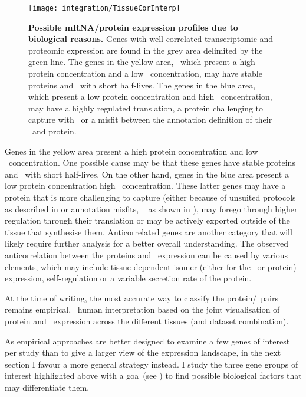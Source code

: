 \begin{figure}[!htb]
    \texttt{[image: integration/TissueCorInterp]}\centering
    \vspace{-3mm}
    \caption[Possible mRNA/protein expression profiles
    due to biological reasons.]{\label{fig:CorImprovable}%
    \textbf{Possible mRNA/protein expression profiles due to biological reasons.}
    Genes with well-correlated transcriptomic and proteomic expression
    are found in the grey area delimited by the green line.
    The genes in the yellow area,
    \ie\ which present a high protein concentration and a low \mRNA\ concentration,
    may have stable proteins and \mRNAs\ with short half-lives.
    The genes in the blue area,
    which present a low protein concentration and high \mRNA\ concentration,
    may have a highly regulated translation,
    a protein challenging to capture with \ms\,
    or a misfit between the annotation definition of their \mRNA\ and protein.
    }
\end{figure}

Genes in the yellow area present a high protein concentration
and low \mRNA\ concentration.
One possible cause may be that these genes have stable proteins
and \mRNAs\ with short half-lives.
On the other hand,
genes in the blue area present a low protein concentration
high \mRNA\ concentration.
These latter genes may have a protein that is more challenging to capture
(either because of unsuited protocols as described in 
or annotation misfits, \eg\  as shown in ),
may forego through higher regulation through their translation
or may be actively exported outside of the tissue that synthesise them.
Anticorrelated genes are another category that will likely require
further analysis for a better overall understanding.
The observed anticorrelation between the proteins and \mRNAs\ expression
can be caused by various elements, which may include
tissue dependent isomer (either for the \mRNA\ or protein) expression,
self-regulation or a variable secretion rate of the protein.

At the time of writing,
the most accurate way to classify the protein/\mRNA\ pairs
remains empirical,
\ie\ human interpretation based on
the joint visualisation of protein and \mRNA\ expression
across the different tissues (and dataset combination).

As empirical approaches are better designed
to examine a few genes of interest per study
than to give a larger view of the expression landscape,
in the next section I favour a more general strategy instead.
I study the three gene groups of interest highlighted above
with a \glsdesc{goa}~(see )
to find possible biological factors that may differentiate them.

